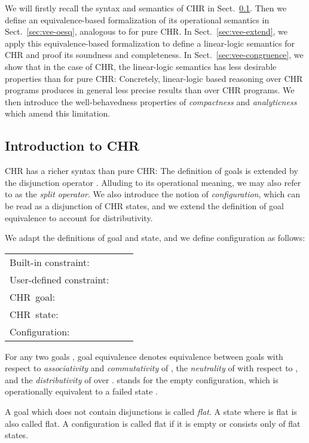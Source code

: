 \documentclass[acmtocl]{acmtrans2m}
\newcommand{\chrv}{CHR}
\begin{document}
We will firstly recall the syntax and semantics of CHR in
Sect.~\ref{sec:vee-intro}. Then we define an equivalence-based formalization of
its operational semantics in Sect.~\ref{sec:vee-oesq}, analogous to  for
pure CHR. In Sect.~\ref{sec:vee-extend}, we apply this equivalence-based
formalization to define a linear-logic semantics for CHR and proof its soundness and
completeness. In Sect.~\ref{sec:vee-congruence}, we show that in the case of
CHR, the linear-logic semantics has less desirable properties than for
pure CHR: Concretely, linear-logic based reasoning over CHR
programs produces in general less precise results than over CHR programs. We
then introduce the well-behavedness properties of \emph{compactness} and
\emph{analyticness} which amend this limitation.

\subsection{Introduction to CHR}
\label{sec:vee-intro}

CHR has a richer syntax than pure CHR: The definition of goals
is extended by the disjunction operator . Alluding to its operational meaning,
we may also refer to  as the \emph{split operator}. We also introduce the
notion of \emph{configuration}, which can be read as a disjunction of CHR states,
and we extend the definition of goal equivalence to account for
distributivity.

\begin{definition}
	\label{chrv-state-conf}
We adapt the definitions of goal and state, and we define configuration as
follows:

\medskip
\begin{tabular}{l @{\quad} r @{\,::=\,} l}
	Built-in constraint: &
		 &
			\\
	User-defined constraint: &
		 &
			\\
	\chrv\ goal: &
		 &
			\\
	\chrv\ state: &
		  &
			 \\
	Configuration: &
		 &
			
\end{tabular}

\medskip For any two goals , goal equivalence  denotes
equivalence between goals with respect to \emph{associativity} and
\emph{commutativity} of , the \emph{neutrality} of  with respect to
, and the \emph{distributivity} of  over . 
stands for the empty configuration, which is operationally equivalent to a
failed state .

A goal which does not contain disjunctions is called \emph{flat}. A
state  where  is flat is also called flat. A
configuration  is called flat if it is empty or consists only of flat
states.
\end{definition}
\end{document}
